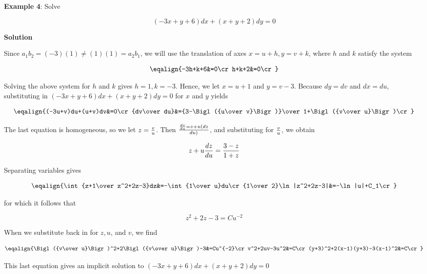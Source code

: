 \nopagenumbers
{\bf Example 4}: Solve

$$(-3x+y+6)dx+(x+y+2)dy=0$$

{\bf Solution}

\vskip 6pt
Since $a_1b_2=(-3)(1)\neq(1)(1)=a_2b_1$, we will use the translation of axes $x=u+h, y=v+k$, where $h$ and $k$ satisfy the system

$$\eqalign{-3h+k+6&=0\cr
	h+k+2&=0\cr}$$

Solving the above system for $h$ and $k$ gives $h=1,k=-3$. Hence, we let $x=u+1$ and $y=v-3$. Because $dy=dv$ and $dx=du$, substituting in $(-3x+y+6)dx+(x+y+2)dy=0$ for $x$ and $y$ yields

$$\eqalign{(-3u+v)du+(u+v)dv&=0\cr
	{dv\over du}&={3-\Bigl({u\over v}\Bigr)}\over 1+\Bigl({v\over u}\Bigr)\cr}$$

The last equation is homogeneous, so we let $z={v\over u}$. Then ${dv\over du}=z+u(dz\over du)$, and substituting for ${v\over u}$, we obtain

$$z+u{dz\over du}={3-z\over 1+z}$$

Separating variables gives

$$\eqalign{\int{z+1\over z^2+2z-3}dz&=-\int{1\over u}du\cr
	{1\over 2}\ln|z^2+2z-3|&=-\ln|u|+C_1\cr}$$

for which it follows that

$$z^2+2z-3=Cu^{-2}$$

When we substitute back in for $z,u$, and $v$, we find

$$\eqalign{\Bigl({v\over u}\Bigr)^2+2\Bigl({v\over u}\Bigr)-3&=Cu^{-2}\cr
		v^2+2uv-3u^2&=C\cr
		(y+3)^2+2(x-1)(y+3)-3(x-1)^2&=C\cr}$$

This last equation gives an implicit solution to $(-3x+y+6)dx+(x+y+2)dy=0$

\vfill\eject
\bye
